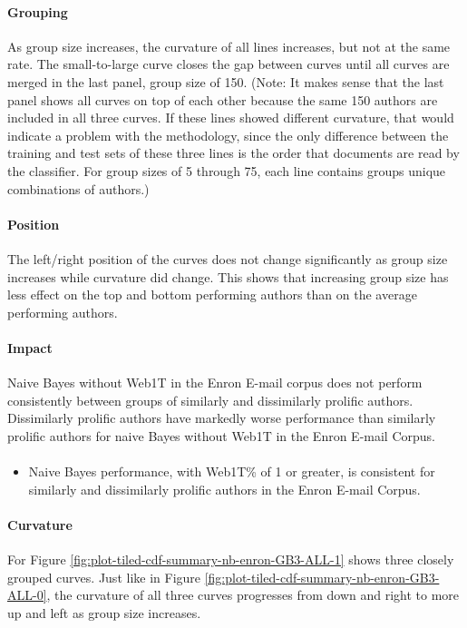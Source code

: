 \paragraph*{Grouping}As group size increases, the curvature of all lines increases, but not at the same rate.  The small-to-large curve closes the gap between curves until all curves are merged in the last panel, group size of 150.  (Note: It makes sense that the last panel shows all curves on top of each other because the same 150 authors are included in all three curves.  If these lines showed different curvature, that would indicate a problem with the methodology, since the only difference between the training and test sets of these three lines is the order that documents are read by the classifier.  For group sizes of 5 through 75, each line contains groups unique combinations of authors.)
\paragraph*{Position}The left/right position of the curves does not change significantly as group size increases while curvature did change.  This shows that increasing group size has less effect on the top and bottom performing authors than on the average performing authors.
\paragraph*{Impact} Naive Bayes without Web1T in the Enron E-mail corpus does not perform consistently between groups of similarly and dissimilarly prolific authors.  Dissimilarly prolific authors have markedly worse performance than similarly prolific authors for naive Bayes without Web1T in the Enron E-mail Corpus.

\paragraph*{} 
\begin{itemize}
\item Naive Bayes performance, with Web1T\% of 1 or greater, is consistent for similarly and dissimilarly prolific authors in the Enron E-mail Corpus.
\end{itemize}

\paragraph*{Curvature} For Figure \ref{fig:plot-tiled-cdf-summary-nb-enron-GB3-ALL-1} shows three closely grouped curves.  Just like in Figure \ref{fig:plot-tiled-cdf-summary-nb-enron-GB3-ALL-0}, the curvature of all three curves progresses from down and right to more up and left as group size increases.  
